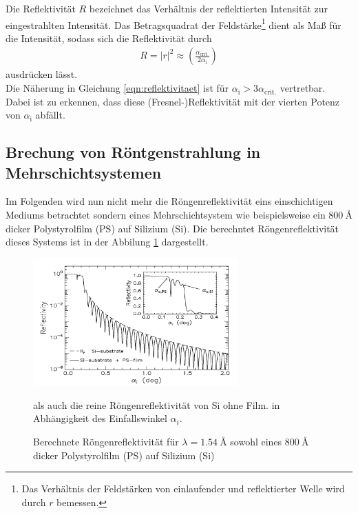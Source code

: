 Die Reflektivität $R$ bezeichnet das Verhältnis der reflektierten Intensität
zur eingestrahlten Intensität.
Das Betragsquadrat der
Feldstärke\footnote{Das Verhältnis der Feldstärken von einlaufender und
reflektierter Welle wird durch $r$ bemessen.} dient als Maß für die Intensität,
sodass sich die Reflektivität durch
\begin{align}
  R = \lvert r \rvert^{2} \approx
  \left( \frac{\alpha_{\text{crit.}}}{2\alpha_{\text{i}}} \right)
  \label{eqn:reflektivitaet}
\end{align}
ausdrücken lässt.\\
Die Näherung in Gleichung \eqref{eqn:reflektivitaet} ist für
$\alpha_{\text{i}} > 3\alpha_{\text{crit.}}$ vertretbar. Dabei ist zu erkennen,
dass diese (Fresnel-)Reflektivität mit der vierten Potenz von $\alpha_{\text{i}}$
abfällt.

\subsection{Brechung von Röntgenstrahlung in Mehrschichtsystemen}
\label{subsec:mehrschicht}
Im Folgenden wird nun nicht mehr
die Röngenreflektivität
eins einschichtigen
Mediums betrachtet sondern eines Mehrschichtsystem wie
beispielsweise ein $\SI{800}{\angstrom}$ dicker Polystyrolfilm (PS)
auf Silizium (Si). Die berechntet Röngenreflektivität dieses
Systems ist in der Abbilung \ref{fig:mehrschicht} dargestellt.

\begin{figure}
\centering
\includegraphics[width = 0.7\textwidth]{bilder/mehrschicht_beispiel.PNG}
\caption{Berechnete Röngenreflektivität für $\lambda=\SI{1.54}{\angstrom} $ sowohl eines
$\SI{800}{\angstrom}$ dicker Polystyrolfilm (PS)
auf Silizium (Si)} als auch die reine Röngenreflektivität von Si ohne Film.
in Abhängigkeit des Einfallswinkel $\alpha_i$.\cite{sample}
\label{fig:mehrschicht}
\end{figure}

